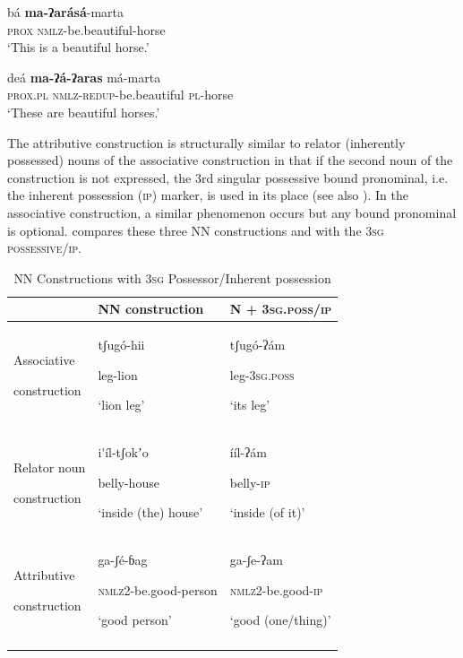 \documentclass[output=paper]{langsci/langscibook}
\begin{document}
\ea\label{ex:ahlandc:51}
\ea\label{ex:ahlandc:51a}
\gll
b\'{a} \textbf{ma-ʔar\'{a}s\'{a}}{}-marta \\
\textsc{prox}  \textsc{nmlz}-be.beautiful-horse\\
\glt
‘This is a beautiful horse.’

\ex\label{ex:ahlandc:51b}
\gll
de\'{a}          \textbf{ma-ʔ\'{a}-ʔaras}  m\'{a}-marta \\
  \textsc{prox.pl}   \textsc{nmlz-redup}{}-be.beautiful  \textsc{pl}{}-horse \\
  \glt
‘These are beautiful horses.’
\z 
\z 

The attributive construction is structurally similar to relator (inherently possessed) nouns of the associative construction in that if the second noun of the construction is not expressed, the 3rd singular possessive bound pronominal, i.e. the inherent possession (\textsc{ip}) marker, is used in its place (see also ). In the associative construction, a similar phenomenon occurs but any bound pronominal is optional.  compares these three NN constructions and with the 3\textsc{sg possessive/ip.}


\begin{table}

\begin{tabularx}{\textwidth}{XXX} 
\lsptoprule
& NN construction & \scshape N + 3sg.poss/ip\\
\midrule

Associative

construction & {tʃug\'{o}-hii} 

leg-lion

‘lion leg’ & {tʃug\'{o}-ʔ\'{a}m} 

leg-\textsc{3sg.poss}

‘its leg’\\
Relator noun 

construction & {i\'{ }\'{i}l-tʃokʼo}

belly-house

\mdseries ‘inside (the) house’ & {\'{i}\'{i}l-ʔ\'{a}m}

belly-\textsc{ip}

\mdseries ‘inside (of it)’\\
Attributive
 
construction & {ga-ʃ\'{e}-ɓag  }

\textsc{nmlz2-}be.good-person

‘good person’ & {ga{}-ʃe-ʔam}

\textsc{nmlz2-}be.good-\textsc{ip}

‘good (one/thing)’\\
\lspbottomrule
\end{tabularx}
\caption{NN Constructions with \textsc{3sg }Possessor/Inherent possession}
\label{tab:ahlandc:9}
\end{table}
\end{document}
